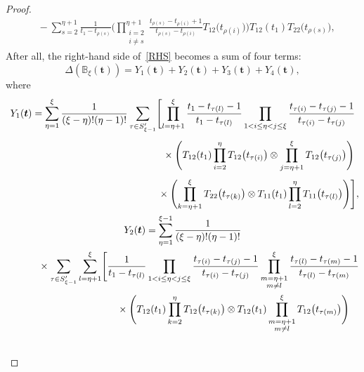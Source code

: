 \documentclass[10pt,a4paper]{amsart}
\numberwithin{equation}{section}
\begin{document}
\begin{proof}
\begin{align*}
&{}{-}\sum_{s=2}^{\eta+1} \frac{1}{t_1-t_{\rho(s)}}\Biggl( \prod_{\substack{i=2\\i\neq s}}^{\eta+1} \frac{t_{\rho(s)}-t_{\rho(i)}+1}{t_{\rho(s)}-t_{\rho(i)}} T_{12} \bigl(t_{\rho(i)}\bigr) \Biggr) T_{12} (t_1)T_{22} \bigl(t_{\rho(s)}\bigr),
\end{align*}
After all, the right-hand side of~\eqref{RHS} becomes a sum of four terms:
\begin{equation*}
\Delta ( {\mathbb{B}}_\xi(\boldsymbol{t}) )=Y_1(\boldsymbol{t})+Y_2(\boldsymbol{t})+Y_3(\boldsymbol{t})+Y_4(\boldsymbol{t}),
\end{equation*}
where
\begin{gather*}
 Y_1(\boldsymbol{t})= \sum_{\eta=1}^{\xi} \frac{1}{(\xi-\eta) ! (\eta-1)!} \sum_{\tau\in S_{\xi-1}'} \Biggl[ \prod_{l=\eta+1}^{\xi } \frac{t_1-t_{\tau(l)}-1}{t_1-t_{\tau(l)}} \prod_{1< i\leq\eta<j \leq \xi} \frac{t_{\tau(i)}-t_{\tau(j)}-1}{t_{\tau(i)}-t_{\tau(j)}}\\[1mm]
 \hphantom{Y_1(\boldsymbol{t})= \sum_{\eta=1}^{\xi} \frac{1}{(\xi-\eta) ! (\eta-1)!} \sum_{\tau\in S_{\xi-1}'} \Biggl[}{}
 \times\Biggl(T_{12}(t_1) \prod_{i=2}^{\eta} T_{12} \bigl(t_{\tau(i)}\bigr) \otimes \prod_{j=\eta+1}^{\xi} T_{12} \bigl(t_{\tau(j)}\bigr) \Biggr)\\[1mm]
 \hphantom{Y_1(\boldsymbol{t})= \sum_{\eta=1}^{\xi} \frac{1}{(\xi-\eta) ! (\eta-1)!} \sum_{\tau\in S_{\xi-1}'} \Biggl[}{}
 \times \Biggl(\prod_{k=\eta+1}^{\xi } T _{22}\bigl(t_{\tau(k)}\bigr)\otimes T_{11}(t_1) \prod_{l=2}^{\eta} T _{11}\bigl(t_{\tau(l)}\bigr)\Biggr)\Biggr],
\\
Y_2(\boldsymbol{t})= \sum_{\eta=1}^{\xi-1} \frac{1}{(\xi-\eta) ! (\eta-1)!} \\
\hphantom{Y_2(\boldsymbol{t})= }{}
\times \sum_{\tau\in S_{\xi-1}'} \sum_{l=\eta+1}^\xi \Biggl[ \frac{1}{t_1-t_{\tau(l)}}\prod_{1< i\leq\eta<j \leq \xi} \frac{t_{\tau(i)}-t_{\tau(j)}-1}{t_{\tau(i)}-t_{\tau(j)}} \prod_{\substack{m=\eta+1\\m\neq l}}^\xi \frac{t_{\tau(l)}-t_{\tau(m)}-1}{t_{\tau(l)}-t_{\tau(m)}} \\
\hphantom{Y_2(\boldsymbol{t})=\times \sum_{\tau\in S_{\xi-1}'} \sum_{l=\eta+1}^\xi \Biggl[}{}
 \times\Biggl( T_{12} (t_1)\prod_{k=2}^{\eta} T_{12} \bigl(t_{\tau(k)}\bigr) \otimes T_{12}(t_1) \prod_{\substack{m=\eta+1\\m\neq l}}^\xi T_{12} \bigl(t_{\tau(m)}\bigr)\Biggr)\\
\hphantom{Y_2(\boldsymbol{t})=\times \sum_{\tau\in S_{\xi-1}'} \sum_{l=\eta+1}^\xi \Biggl[}{}

\end{gather*}
\end{proof}
\end{document}
